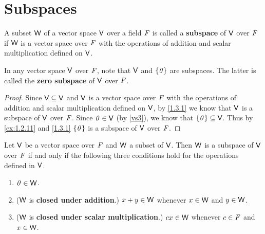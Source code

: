 \section{Subspaces}\label{sec:1.3}

\begin{defn}\label{1.3.1}
  A subset \(\mathsf{W}\) of a vector space \(\mathsf{V}\) over a field \(\mathit{F}\) is called a \textbf{subspace} of \(\mathsf{V}\) over \(\mathit{F}\) if \(\mathsf{W}\) is a vector space over \(\mathit{F}\) with the operations of addition and scalar multiplication defined on \(\mathsf{V}\).
\end{defn}

\begin{eg}\label{1.3.2}
  In any vector space \(\mathsf{V}\) over \(\mathit{F}\), note that \(\mathsf{V}\) and \(\left\lbrace\mathit{0}\right\rbrace\) are subspaces.
  The latter is called the \textbf{zero subspace} of \(\mathsf{V}\) over \(\mathit{F}\).
\end{eg}

\begin{proof}
  Since \(\mathsf{V} \subseteq \mathsf{V}\) and \(\mathsf{V}\) is a vector space over \(\mathit{F}\) with the operations of addition and scalar multiplication defined on \(\mathsf{V}\), by \cref{1.3.1} we know that \(\mathsf{V}\) is a subspace of \(\mathsf{V}\) over \(\mathit{F}\).
  Since \(\mathit{0} \in \mathsf{V}\) (by \ref{vs3}), we know that \(\left\lbrace\mathit{0}\right\rbrace \subseteq \mathsf{V}\).
  Thus by \cref{ex:1.2.11} and \cref{1.3.1} \(\left\lbrace\mathit{0}\right\rbrace\) is a subspace of \(\mathsf{V}\) over \(\mathit{F}\).
\end{proof}

\begin{thm}\label{1.3}
  Let \(\mathsf{V}\) be a vector space over \(\mathit{F}\) and \(\mathsf{W}\) a subset of \(\mathsf{V}\).
  Then \(\mathsf{W}\) is a subspace of \(\mathsf{V}\) over \(\mathit{F}\) if and only if the following three conditions hold for the operations defined in \(\mathsf{V}\).
  \begin{enumerate}
    \item \(\mathit{0} \in \mathsf{W}\).
    \item (\(\mathsf{W}\) is \textbf{closed under addition}.)
          \(x + y \in \mathsf{W}\) whenever \(x \in \mathsf{W}\) and \(y \in \mathsf{W}\).
    \item (\(\mathsf{W}\) is \textbf{closed under scalar multiplication}.)
          \(cx \in \mathsf{W}\) whenever \(c \in \mathit{F}\) and \(x \in \mathsf{W}\).
  \end{enumerate}
\end{thm}

